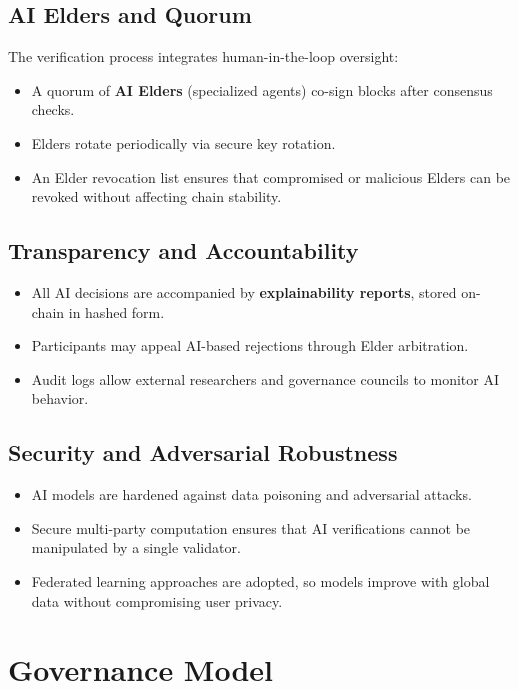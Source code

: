 \documentclass[11pt,a4paper]{article}
\begin{document}
\subsection{AI Elders and Quorum}
The verification process integrates human-in-the-loop oversight:
\begin{itemize}
    \item A quorum of \textbf{AI Elders} (specialized agents) co-sign blocks after consensus checks.
    \item Elders rotate periodically via secure key rotation.
    \item An Elder revocation list ensures that compromised or malicious Elders can be revoked without affecting chain stability.
\end{itemize}

\subsection{Transparency and Accountability}
\begin{itemize}
    \item All AI decisions are accompanied by \textbf{explainability reports}, stored on-chain in hashed form.
    \item Participants may appeal AI-based rejections through Elder arbitration.
    \item Audit logs allow external researchers and governance councils to monitor AI behavior.
\end{itemize}

\subsection{Security and Adversarial Robustness}
\begin{itemize}
    \item AI models are hardened against data poisoning and adversarial attacks.
    \item Secure multi-party computation ensures that AI verifications cannot be manipulated by a single validator.
    \item Federated learning approaches are adopted, so models improve with global data without compromising user privacy.
\end{itemize}

\section{Governance Model}
\end{document}

